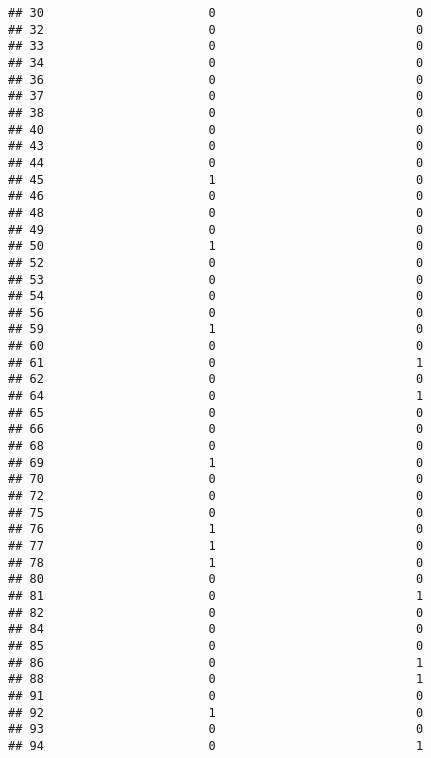 \documentclass[
]{article}
\begin{document}
\begin{verbatim}
## 30                       0                            0
## 32                       0                            0
## 33                       0                            0
## 34                       0                            0
## 36                       0                            0
## 37                       0                            0
## 38                       0                            0
## 40                       0                            0
## 43                       0                            0
## 44                       0                            0
## 45                       1                            0
## 46                       0                            0
## 48                       0                            0
## 49                       0                            0
## 50                       1                            0
## 52                       0                            0
## 53                       0                            0
## 54                       0                            0
## 56                       0                            0
## 59                       1                            0
## 60                       0                            0
## 61                       0                            1
## 62                       0                            0
## 64                       0                            1
## 65                       0                            0
## 66                       0                            0
## 68                       0                            0
## 69                       1                            0
## 70                       0                            0
## 72                       0                            0
## 75                       0                            0
## 76                       1                            0
## 77                       1                            0
## 78                       1                            0
## 80                       0                            0
## 81                       0                            1
## 82                       0                            0
## 84                       0                            0
## 85                       0                            0
## 86                       0                            1
## 88                       0                            1
## 91                       0                            0
## 92                       1                            0
## 93                       0                            0
## 94                       0                            1

\end{verbatim}
\end{document}
